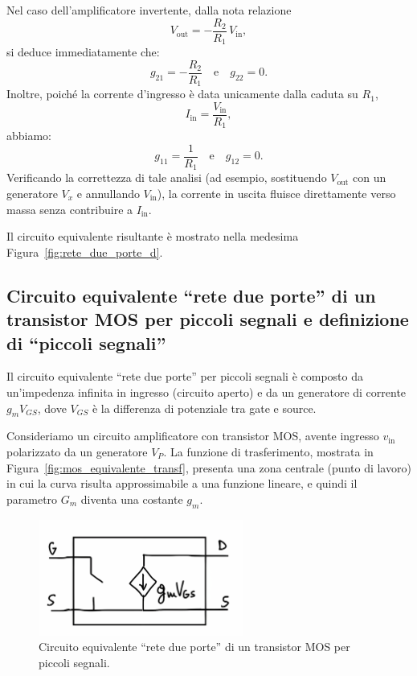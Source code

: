 Nel caso dell'amplificatore invertente, dalla nota relazione
\[
V_{\text{out}} = -\frac{R_2}{R_1}\, V_{\text{in}},
\]
si deduce immediatamente che:
\[
g_{21} = -\frac{R_2}{R_1} \quad \text{e} \quad g_{22} = 0.
\]
Inoltre, poiché la corrente d’ingresso è data unicamente dalla caduta su \(R_1\),
\[
I_{\text{in}} = \frac{V_{\text{in}}}{R_1},
\]
abbiamo:
\[
g_{11} = \frac{1}{R_1} \quad \text{e} \quad g_{12} = 0.
\]
Verificando la correttezza di tale analisi (ad esempio, sostituendo \(V_{\text{out}}\) con un generatore \(V_x\) e annullando \(V_{\text{in}}\)), la corrente in uscita fluisce direttamente verso massa senza contribuire a \(I_{\text{in}}\).

Il circuito equivalente risultante è mostrato nella medesima Figura~\ref{fig:rete_due_porte_d}.

\newpage

\subsection{Circuito equivalente “rete due porte” di un transistor MOS per piccoli segnali e definizione di “piccoli segnali”}

Il circuito equivalente “rete due porte” per piccoli segnali è composto da un'impedenza infinita in ingresso (circuito aperto) e da un generatore di corrente \(g_m V_{GS}\), dove \(V_{GS}\) è la differenza di potenziale tra gate e source.

Consideriamo un circuito amplificatore con transistor MOS, avente ingresso \(v_{\text{in}}\) polarizzato da un generatore \(V_P\). La funzione di trasferimento, mostrata in Figura~\ref{fig:mos_equivalente_transf}, presenta una zona centrale (punto di lavoro) in cui la curva risulta approssimabile a una funzione lineare, e quindi il parametro \(G_m\) diventa una costante \(g_m\).\\[2mm]
\begin{figure}[H]
    \centering
    \includegraphics[width=0.6\textwidth]{images/1.1.2.1.png}
    \caption{Circuito equivalente “rete due porte” di un transistor MOS per piccoli segnali.}
    \label{fig:mos_equivalente}
\end{figure}

